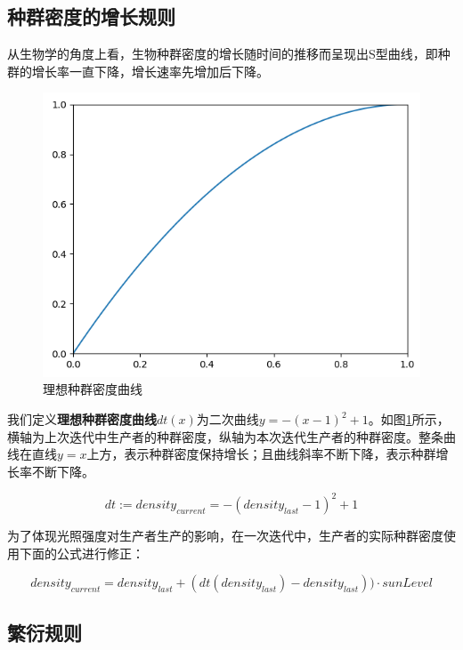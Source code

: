 \documentclass{ctexart}
\begin{document}
\subsection{种群密度的增长规则} \label{sec:density-growth-curve}

从生物学的角度上看，生物种群密度的增长随时间的推移而呈现出S型曲线，即种群的增长率一直下降，增长速率先增加后下降。

\begin{figure}[ht]
  \centering
  \includegraphics[scale=0.6]{density-curve.png}
  \caption{理想种群密度曲线}
  \label{fig:density-curve}
\end{figure}

我们定义\textbf{理想种群密度曲线$dt(x)$}为二次曲线$y = -(x-1)^2 + 1$。如图\ref{fig:density-curve}所示，横轴为上次迭代中生产者的种群密度，纵轴为本次迭代生产者的种群密度。整条曲线在直线$y=x$上方，表示种群密度保持增长；且曲线斜率不断下降，表示种群增长率不断下降。

\begin{equation}
  dt:= density_{current} = -(density_{last} - 1)^{2} + 1
  \label{equ:density-curve}
\end{equation}

为了体现光照强度对生产者生产的影响，在一次迭代中，生产者的实际种群密度使用下面的公式进行修正：

\begin{equation}
  density_{current} = density_{last} + (dt(density_{last}) - density_{last})) \cdot sunLevel
\end{equation}

\subsection{繁衍规则}
\end{document}
